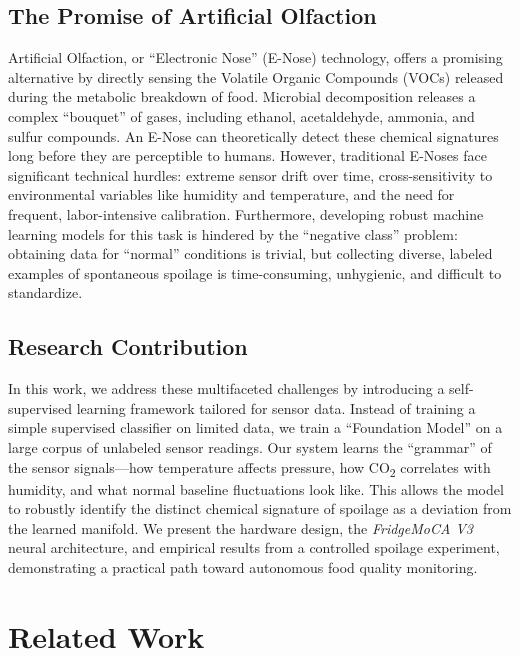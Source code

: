 \documentclass[conference]{IEEEtran}
\begin{document}
    \subsection{The Promise of Artificial Olfaction}
    Artificial Olfaction, or ``Electronic Nose'' (E-Nose) technology, offers a promising alternative by directly sensing the Volatile Organic Compounds (VOCs) released during the metabolic breakdown of food. Microbial decomposition releases a complex ``bouquet'' of gases, including ethanol, acetaldehyde, ammonia, and sulfur compounds. An E-Nose can theoretically detect these chemical signatures long before they are perceptible to humans. However, traditional E-Noses face significant technical hurdles: extreme sensor drift over time, cross-sensitivity to environmental variables like humidity and temperature, and the need for frequent, labor-intensive calibration. Furthermore, developing robust machine learning models for this task is hindered by the ``negative class'' problem: obtaining data for ``normal'' conditions is trivial, but collecting diverse, labeled examples of spontaneous spoilage is time-consuming, unhygienic, and difficult to standardize.

    \subsection{Research Contribution}
    In this work, we address these multifaceted challenges by introducing a self-supervised learning framework tailored for sensor data. Instead of training a simple supervised classifier on limited data, we train a ``Foundation Model'' on a large corpus of unlabeled sensor readings. Our system learns the ``grammar'' of the sensor signals—how temperature affects pressure, how CO\textsubscript{2} correlates with humidity, and what normal baseline fluctuations look like. This allows the model to robustly identify the distinct chemical signature of spoilage as a deviation from the learned manifold. We present the hardware design, the \textit{FridgeMoCA V3} neural architecture, and empirical results from a controlled spoilage experiment, demonstrating a practical path toward autonomous food quality monitoring.

    \section{Related Work}
\end{document}
